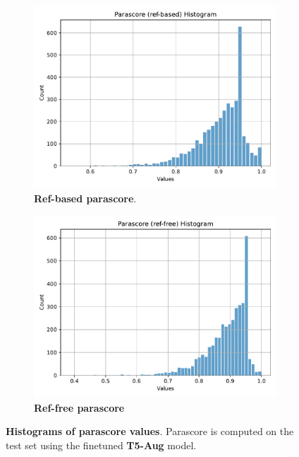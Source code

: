 \documentclass[fleqn,moreauthors,10pt]{ds_report}
\begin{document}
\begin{figure}[ht]
    \centering
    \begin{subfigure}{0.45\linewidth} %
        \centering
        \includegraphics[width=\textwidth]{report/fig/t5-aug-parascore-ref-based-hist.pdf}
        \caption{\textbf{Ref-based parascore}.}
        \label{fig:t5-aug-parascore-ref-based-hist}
    \end{subfigure}
    \hfill %
    \begin{subfigure}{0.45\linewidth} %
        \centering
        \includegraphics[width=\textwidth]{report/fig/t5-aug-parascore-ref-free-hist.pdf}
        \caption{\textbf{Ref-free parascore}}
        \label{fig:t5-aug-parascore-ref-free-hist}
    \end{subfigure}
    \caption{\textbf{Histograms of parascore values}. Parascore is computed on the test set using the finetuned \textbf{T5-Aug} model.}
    \label{fig:t5-parascore-hist}
\end{figure}
\end{document}

